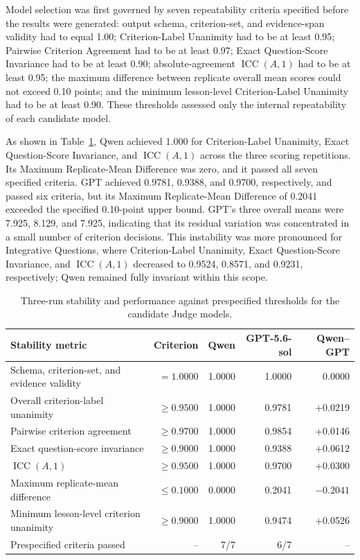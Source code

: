 Model selection was first governed by seven repeatability criteria specified before the results were generated: output schema, criterion-set, and evidence-span validity had to equal 1.00; Criterion-Label Unanimity had to be at least 0.95; Pairwise Criterion Agreement had to be at least 0.97; Exact Question-Score Invariance had to be at least 0.90; absolute-agreement $\operatorname{ICC}(A,1)$ had to be at least 0.95; the maximum difference between replicate overall mean scores could not exceed 0.10 points; and the minimum lesson-level Criterion-Label Unanimity had to be at least 0.90. These thresholds assessed only the internal repeatability of each candidate model.

As shown in Table~\ref{tab:judge-repeatability-thresholds}, Qwen achieved 1.000 for Criterion-Label Unanimity, Exact Question-Score Invariance, and $\operatorname{ICC}(A,1)$ across the three scoring repetitions. Its Maximum Replicate-Mean Difference was zero, and it passed all seven specified criteria. GPT achieved 0.9781, 0.9388, and 0.9700, respectively, and passed six criteria, but its Maximum Replicate-Mean Difference of 0.2041 exceeded the specified 0.10-point upper bound. GPT's three overall means were 7.925, 8.129, and 7.925, indicating that its residual variation was concentrated in a small number of criterion decisions. This instability was more pronounced for Integrative Questions, where Criterion-Label Unanimity, Exact Question-Score Invariance, and $\operatorname{ICC}(A,1)$ decreased to 0.9524, 0.8571, and 0.9231, respectively; Qwen remained fully invariant within this scope.

\begin{table}[H]
\centering
\caption{Three-run stability and performance against prespecified thresholds for the candidate Judge models.}
\label{tab:judge-repeatability-thresholds}
\scriptsize
\setlength{\tabcolsep}{3pt}
\renewcommand{\arraystretch}{1.15}
\begin{tabular*}{\textwidth}{@{\extracolsep{\fill}}>{\raggedright\arraybackslash}p{}rrrr@{}}
\toprule
\textbf{Stability metric} & \textbf{Criterion} & \textbf{Qwen} & \textbf{GPT-5.6-sol} & \textbf{Qwen--GPT} \\
\midrule
Schema, criterion-set, and evidence validity & $=1.0000$ & 1.0000 & 1.0000 & 0.0000 \\
Overall criterion-label unanimity & $\geq0.9500$ & 1.0000 & 0.9781 & +0.0219 \\
Pairwise criterion agreement & $\geq0.9700$ & 1.0000 & 0.9854 & +0.0146 \\
Exact question-score invariance & $\geq0.9000$ & 1.0000 & 0.9388 & +0.0612 \\
$\operatorname{ICC}(A,1)$ & $\geq0.9500$ & 1.0000 & 0.9700 & +0.0300 \\
Maximum replicate-mean difference & $\leq0.1000$ & 0.0000 & 0.2041 & $-0.2041$ \\
Minimum lesson-level criterion unanimity & $\geq0.9000$ & 1.0000 & 0.9474 & +0.0526 \\
Prespecified criteria passed & -- & 7/7 & 6/7 & -- \\
\bottomrule
\end{tabular*}
\end{table}

